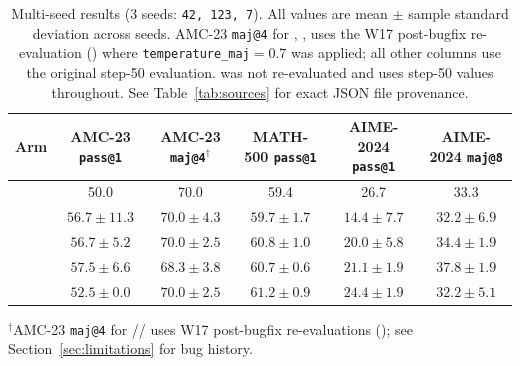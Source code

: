 \begin{table}[t]
\centering\small
\caption{Multi-seed results (3 seeds: \texttt{42, 123, 7}).
All values are mean $\pm$ sample standard deviation across seeds.
AMC-23 \texttt{maj@4} for \armA{}, \armB{}, \armC{} uses the W17
post-bugfix re-evaluation () where
\texttt{temperature\_maj}$=0.7$ was applied; all other columns use the
original step-50 evaluation. \armD{} was not re-evaluated and uses
step-50 values throughout. See Table~\ref{tab:sources} for exact JSON
file provenance.}
\label{tab:main}
\begin{tabular}{lccccc}
\toprule
Arm & AMC-23 \texttt{pass@1} & AMC-23 \texttt{maj@4}$^\dagger$ & MATH-500 \texttt{pass@1} & AIME-2024 \texttt{pass@1} & AIME-2024 \texttt{maj@8} \\
\midrule
\base{} & 50.0 & 70.0 & 59.4 & 26.7 & 33.3 \\
\armA{} & $56.7\pm11.3$ & $70.0\pm4.3$ & $59.7\pm1.7$ & $14.4\pm7.7$ & $32.2\pm6.9$ \\
\armB{} & $56.7\pm5.2$  & $70.0\pm2.5$ & $60.8\pm1.0$ & $20.0\pm5.8$ & $34.4\pm1.9$ \\
\armC{} & $57.5\pm6.6$  & $68.3\pm3.8$ & $60.7\pm0.6$ & $21.1\pm1.9$ & $37.8\pm1.9$ \\
\armD{} & $52.5\pm0.0$  & $70.0\pm2.5$ & $61.2\pm0.9$ & $24.4\pm1.9$ & $32.2\pm5.1$ \\
\bottomrule
\end{tabular}

\medskip
\noindent\small
$^\dagger$AMC-23 \texttt{maj@4} for \armA{}/\armB{}/\armC{} uses W17
post-bugfix re-evaluations (); see
Section~\ref{sec:limitations} for bug history.
\end{table}
